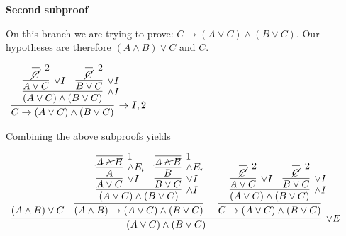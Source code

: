 \documentclass[11pt]{report}
\begin{document}
\begin{enumerate}
	\hspace{0.5cm} {\bf Second subproof}

	On this branch we are trying to prove: $C \to (A \lor C) \land (B \lor C)$. Our hypotheses are therefore $(A\land B) \lor C$ and $C$.
	
	\begin{center}
		$\begin{array}{c}
			\infer[\to I,2]{C \to (A \lor C) \land (B \lor C)}
				{\infer[\land I]{(A \lor C) \land (B \lor C)}
					{\infer[\lor I]{A \lor C}
						{\infer[2]{\cancel{C}}{}}
					&
					\infer[\lor I]{B \lor C}
						{\infer[2]{\cancel{C}}{}}}}
		\end{array}$
	\end{center}

	Combining the above subproofs yields
	\begin{mdframed}
		\begin{center}
			$\begin{array}{c}
				\infer[\lor E]{(A \lor C) \land (B \lor C)}{(A \land B) \lor C
								&
								\infer[]{(A \land B) \to (A \lor C) \land (B \lor C)}
								{\infer[\land I]{(A \lor C) \land (B \lor C)}
									{\infer[\lor I]{A \lor C}
										{\infer[\land E_{l}]{A}
											{\infer[1]{\cancel{A \land B}}{}}}
									&
									\infer[\lor I]{B \lor C}
										{\infer[\land E_{r}]{B}
											{\infer[1]{\cancel{A \land B}}{}}}}}
								&
								\infer[]{C \to (A \lor C) \land (B \lor C)}
								{\infer[\land I]{(A \lor C) \land (B \lor C)}
									{\infer[\lor I]{A \lor C}
										{\infer[2]{\cancel{C}}{}}
									&
									\infer[\lor I]{B \lor C}
										{\infer[2]{\cancel{C}}{}}}}}
			\end{array}$
		\end{center}
	\end{mdframed}
\end{enumerate}
\end{document}
